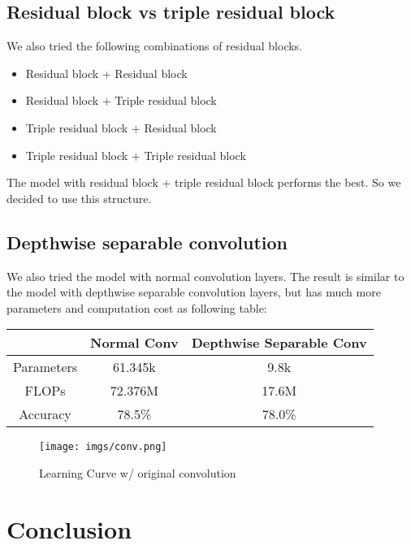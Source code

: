 \documentclass[12pt]{article}
\begin{document}
\subsection{Residual block vs triple residual block}

We also tried the following combinations of residual blocks.

\begin{itemize}
    \item Residual block + Residual block
    \item Residual block + Triple residual block
    \item Triple residual block + Residual block
    \item Triple residual block + Triple residual block
\end{itemize}

The model with residual block + triple residual block performs the best. So we decided to use this structure.

\subsection{Depthwise separable convolution}

We also tried the model with normal convolution layers. The result is similar to the model with depthwise separable convolution layers, but has much more parameters and computation cost as following table:

\begin{table}[h]
\centering
\begin{tabular}{|c|c|c|}
\hline
 & Normal Conv & Depthwise Separable Conv \\
\hline
Parameters & 61.345k & 9.8k \\
\hline
FLOPs & 72.376M & 17.6M \\
\hline
Accuracy & 78.5\% & 78.0\% \\
\hline
\end{tabular}
\end{table}

\begin{figure}[!htbp]
    \centering
    \texttt{[image: imgs/conv.png]}
    \caption{Learning Curve w/ original convolution}
    \label{fig:conv}
\end{figure}
\FloatBarrier

\section{Conclusion}
\end{document}
